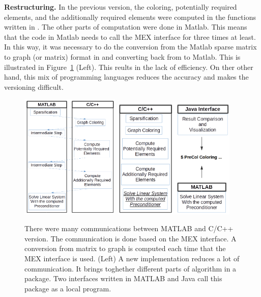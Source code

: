 \documentclass[12pt, oneside]{book}
\begin{document}
\textbf{Restructuring.}
In the previous version, the coloring, 
potentially required elements, and the additionally required elements
were computed in the functions written in .
The other parts of computation were done in Matlab.
This means that the code in Matlab needs to call the
MEX interface for three times at least. 
In this way, it was necessary to do the conversion from the Matlab sparse
matrix to graph (or matrix) format in 
and converting back from  to Matlab.
This is illustrated in Figure~\ref{f.structure} (Left).
This reults in the lack of efficiency. On ther other hand,
this mix of programming languages reduces 
the accuracy and makes the versioning difficult.
\begin{figure}
\centering
\includegraphics[width=0.42\textwidth]{old_struct}
\hfill
\includegraphics[width=0.52\textwidth]{new_struct}
\caption{There were many communications between MATLAB and C/C++ version. The communication
is done based on the MEX interface. A conversion from matrix to graph is computed
each time that the MEX interface is used. (Left) A new implementation reduces a lot of communication.
It brings toghether different parts of algorithm in a package. Two interfaces written
 in MATLAB and Java call this package as a local program.}
\label{f.structure}
\end{figure}
\end{document}
